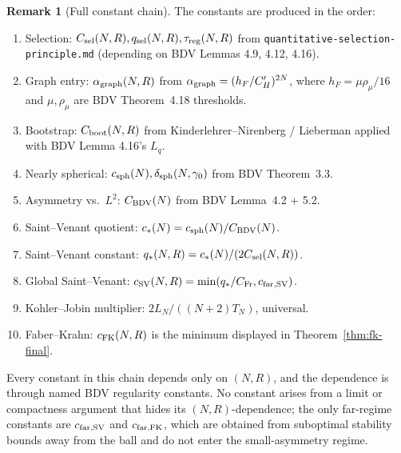 \documentclass[11pt]{amsart}
\theoremstyle{definition}
\newtheorem{remark}[theorem]{Remark}
\begin{document}
\begin{remark}[Full constant chain]
The constants are produced in the order:
\begin{enumerate}
\item Selection: $C_{\rm sel}(N,R), q_{\rm sel}(N,R), \tau_{\rm reg}(N,R)$ from
\texttt{quantitative-selection-principle.md} (depending on BDV Lemmas 4.9, 4.12, 4.16).
\item Graph entry: $\alpha_{\rm graph}(N,R)$ from
$\alpha_{\rm graph}=(h_F/C_H')^{2N}$,
where $h_F=\mu\rho_\mu/16$ and $\mu,\rho_\mu$ are BDV Theorem~4.18 thresholds.
\item Bootstrap: $C_{\rm boot}(N,R)$ from Kinderlehrer--Nirenberg /
Lieberman applied with BDV Lemma 4.16's $L_q$.
\item Nearly spherical: $c_{\rm sph}(N), \delta_{\rm sph}(N,\gamma_0)$ from BDV
Theorem~3.3.
\item Asymmetry vs.\ $L^2$: $C_{\rm BDV}(N)$ from BDV Lemma~4.2 + 5.2.
\item Saint--Venant quotient: $c_*(N)=c_{\rm sph}(N)/C_{\rm BDV}(N)$.
\item Saint--Venant constant: $q_*(N,R)=c_*(N)/(2C_{\rm sel}(N,R))$.
\item Global Saint--Venant: $c_{\rm SV}(N,R)=\min(q_*/C_{\rm Fr},c_{\rm far,SV})$.
\item Kohler--Jobin multiplier: $2L_N/((N+2)T_N)$, universal.
\item Faber--Krahn: $c_{\rm FK}(N,R)$ is the minimum displayed in
Theorem~\ref{thm:fk-final}.
\end{enumerate}
Every constant in this chain depends only on $(N,R)$, and the dependence is
through named BDV regularity constants. No constant arises from a limit or
compactness argument that hides its $(N,R)$-dependence; the only
far-regime constants are $c_{\rm far,SV}$ and $c_{\rm far,FK}$, which are
obtained from suboptimal stability bounds away from the ball and do not enter
the small-asymmetry regime.
\end{remark}
\end{document}
